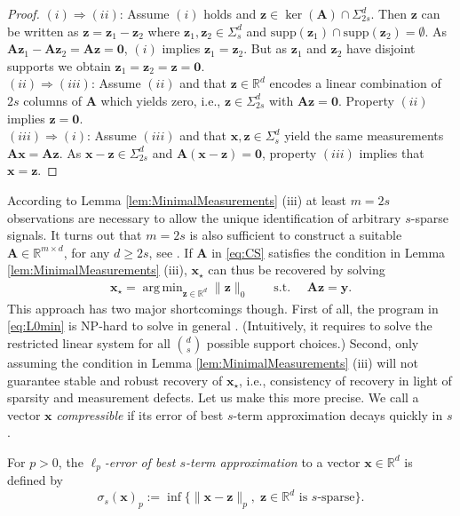 \documentclass{svproc}
\newcommand{\bA}{\boldsymbol{A}}
\newcommand{\bx}{\boldsymbol{x}}
\newcommand{\by}{\boldsymbol{y}}
\newcommand{\bz}{\boldsymbol{z}}
\newcommand{\0}{\boldsymbol{0}}
\newcommand{\1}{\boldsymbol{1}}
\DeclareMathOperator*{\argmin}{arg\,min}
\def\supp{\mathrm{supp}}
\def\R{\mathbb{R}}
\begin{document}
\begin{proof}
    $(i) \Rightarrow (ii)$: Assume $(i)$ holds and $\bz \in \ker(\bA) \cap \Sigma_{2s}^d$. Then $\bz$ can be written as $\bz = \bz_1 - \bz_2$ where $\bz_1,\bz_2 \in \Sigma_s^d$ and $\supp(\bz_1) \cap \supp(\bz_2) = \emptyset$. As $\bA\bz_1 - \bA\bz_2 = \bA\bz = \0$, $(i)$ implies $\bz_1 = \bz_2$. But as $\bz_1$ and $\bz_2$ have disjoint supports we obtain $\bz_1 = \bz_2 = \bz = \0$.\\
    $(ii) \Rightarrow (iii)$: Assume $(ii)$ and that $\bz \in \R^d$ encodes a linear combination of $2s$ columns of $\bA$ which yields zero, i.e., $\bz \in \Sigma_{2s}^d$ with $\bA\bz = \0$. Property $(ii)$ implies $\bz = \0$.\\
    $(iii) \Rightarrow (i)$: Assume $(iii)$ and that $\bx,\bz \in \Sigma_s^d$ yield the same measurements $\bA\bx = \bA\bz$. As $\bx - \bz \in \Sigma_{2s}^d$ and $\bA(\bx - \bz) = \0$, property $(iii)$ implies that $\bx = \bz$.
\end{proof}

According to Lemma \ref{lem:MinimalMeasurements} (iii) at least $m=2s$ observations are necessary to allow the unique identification of arbitrary $s$-sparse signals. It turns out that $m=2s$ is also sufficient to construct a suitable $\bA \in \R^{m\times d}$, for any $d \ge 2s$, see \cite[Theorem 2.14]{foucart2013mathematical}. If $\bA$ in \eqref{eq:CS} satisfies the condition in Lemma \ref{lem:MinimalMeasurements} (iii), $\bx_\star$ can thus be recovered by solving
\begin{align}
    \label{eq:L0min}
    \bx_\star = \argmin_{\bz \in \R^d} \| \bz \|_0
    \qquad \text{s.t. } \quad \bA\bz = \by.
\end{align}
This approach has two major shortcomings though. First of all, the program in \eqref{eq:L0min} is NP-hard to solve in general \cite{natarajan1995sparse}. (Intuitively, it requires to solve the restricted linear system for all $\binom{d}{s}$ %
possible support choices.) Second, only assuming the condition in Lemma \ref{lem:MinimalMeasurements} (iii) will not guarantee stable and robust recovery of $\bx_\star$, i.e., consistency of recovery in light of sparsity and measurement defects. Let us make this more precise. We call a vector $\bx$ \emph{compressible} if its error of best $s$-term approximation decays quickly in $s$.

\begin{definition}\label{def:errorbeststerm}
For $p>0$, the {\em $\ell_p$-error of best $s$-term approximation} to a vector $\bx \in \R^d$ is defined by
\label{NotBApprox}
$$
\sigma_s(\bx)_p := \inf
\big\{
\|\bx-\bz\|_p, \; \bz \in \R^d \mbox{ is $s$-sparse}
\big\}.
$$
\end{definition}
\end{document}
